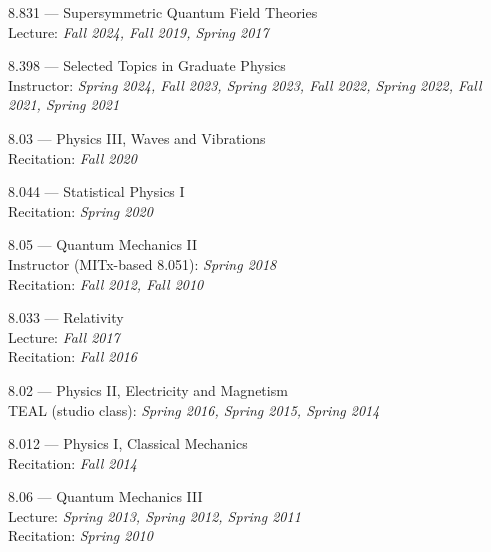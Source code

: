 \bbl
\item 8.831 --- Supersymmetric Quantum Field Theories
\\ Lecture: \emph{Fall 2024, Fall 2019, Spring 2017}
\item 8.398 --- Selected Topics in Graduate Physics
\\ Instructor: \emph{Spring 2024, Fall 2023, Spring 2023, Fall 2022, Spring 2022, Fall 2021, Spring 2021}
\item 8.03 --- Physics III, Waves and Vibrations
\\ Recitation: \emph{Fall 2020}
\item 8.044 --- Statistical Physics I
\\ Recitation: \emph{Spring 2020}
\item 8.05 --- Quantum Mechanics II
\\ Instructor (MITx-based 8.051): \emph{Spring 2018}
\\ Recitation: \emph{Fall 2012, Fall 2010}
\item 8.033 --- Relativity
\\ Lecture: \emph{Fall 2017}
\\ Recitation: \emph{Fall 2016}
\item 8.02 --- Physics II, Electricity and Magnetism
\\ TEAL (studio class): \emph{Spring 2016, Spring 2015, Spring 2014}
\item 8.012 --- Physics I, Classical Mechanics
\\ Recitation: \emph{Fall 2014}
\item 8.06 --- Quantum Mechanics III
\\ Lecture: \emph{Spring 2013, Spring 2012, Spring 2011}
\\ Recitation: \emph{Spring 2010}
\el
